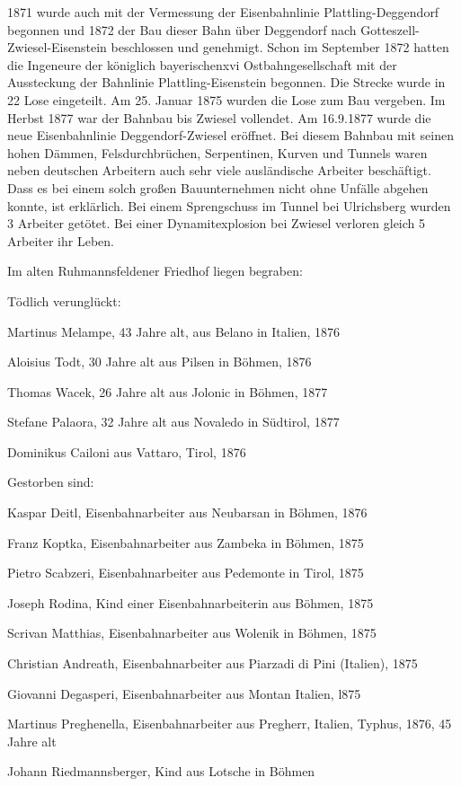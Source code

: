 \documentclass[12pt,a4pager]{book}
\begin{document}
1871 wurde auch mit der Vermessung der Eisenbahnlinie Plattling-Deggendorf
begonnen und 1872 der Bau dieser Bahn über Deggendorf nach
Gotteszell-Zwiesel-Eisenstein beschlossen und genehmigt. Schon im September 1872
hatten die Ingeneure der königlich bayerischenxvi Ostbahngesellschaft mit der
Aussteckung der Bahnlinie Plattling-Eisenstein begonnen. Die Strecke wurde in 22
Lose eingeteilt. Am 25. Januar 1875 wurden die Lose zum Bau vergeben. Im Herbst
1877 war der Bahnbau bis Zwiesel vollendet. Am 16.9.1877 wurde die neue
Eisenbahnlinie Deggendorf-Zwiesel eröffnet. Bei diesem Bahnbau mit seinen hohen
Dämmen, Felsdurchbrüchen, Serpentinen, Kurven und Tunnels waren neben deutschen
Arbeitern auch sehr viele ausländische Arbeiter beschäftigt. Dass es bei einem
solch großen Bauunternehmen nicht ohne Unfälle abgehen konnte, ist erklärlich.
Bei einem Sprengschuss im Tunnel bei Ulrichsberg wurden 3 Arbeiter getötet. Bei
einer Dynamitexplosion bei Zwiesel verloren gleich 5 Arbeiter ihr Leben.

Im alten Ruhmannsfeldener Friedhof liegen begraben:

Tödlich verunglückt:

\begin{compactitem}
\item Martinus Melampe, 43 Jahre alt, aus Belano in Italien, 1876
\item Aloisius Todt, 30 Jahre alt aus Pilsen in Böhmen, 1876
\item Thomas Wacek, 26 Jahre alt aus Jolonic in Böhmen, 1877
\item Stefane Palaora, 32 Jahre alt aus Novaledo in Südtirol, 1877
\item Dominikus Cailoni aus Vattaro, Tirol, 1876
\end{compactitem}

Gestorben sind:

\begin{compactitem}
\item Kaspar Deitl, Eisenbahnarbeiter aus Neubarsan in Böhmen, 1876
\item Franz Koptka, Eisenbahnarbeiter aus Zambeka in Böhmen, 1875
\item Pietro Scabzeri, Eisenbahnarbeiter aus Pedemonte in Tirol, 1875
\item Joseph Rodina, Kind einer Eisenbahnarbeiterin aus Böhmen, 1875
\item Scrivan Matthias, Eisenbahnarbeiter aus Wolenik in Böhmen, 1875
\item Christian Andreath, Eisenbahnarbeiter aus Piarzadi di Pini (Italien), 1875
\item Giovanni Degasperi, Eisenbahnarbeiter aus Montan Italien, l875
\item Martinus Preghenella, Eisenbahnarbeiter aus Pregherr, Italien, Typhus,
1876, 45 Jahre alt
\item Johann Riedmannsberger, Kind aus Lotsche in Böhmen
\end{compactitem}
\end{document}
